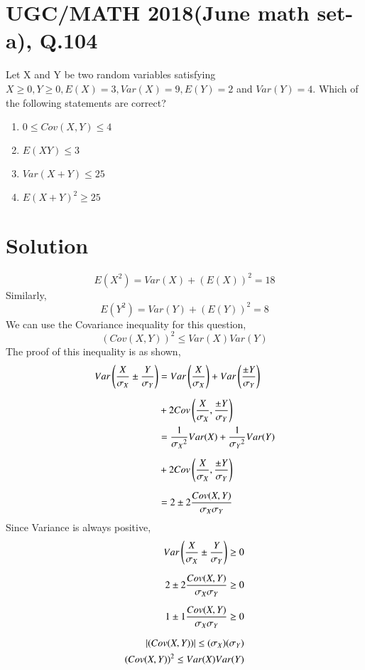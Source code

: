 \documentclass[journal,12pt,twocolumn]{IEEEtran}
\begin{document}
\section*{UGC/MATH 2018(June math set-a), Q.104}
Let X and Y be two random variables satisfying $X\geq 0, Y \geq 0, E(X)=3, Var(X)=9, E(Y)=2$ and $Var(Y)=4$. Which of the following statements are correct?
\begin{enumerate}[label=\Alph*)]
    \item $0\leq Cov(X,Y)\leq 4$
    \item $E(XY)\leq 3$
    \item $Var(X+Y)\leq 25$
    \item $E(X+Y)^2\geq 25$
\end{enumerate}
\section*{Solution}
\begin{equation}
    E(X^2) = Var(X)+(E(X))^2 = 18
\end{equation}
Similarly,
\begin{equation}
    E(Y^2) = Var(Y)+(E(Y))^2 = 8
\end{equation}
We can use the Covariance inequality for this question,
\begin{equation}
  ({Cov(X,Y)})^2\leq Var(X)Var(Y)
\end{equation}
The proof of this inequality is as shown,
\begin{align}
\nonumber    Var\left(\dfrac{X}{\sigma_X}\pm\dfrac{Y}{\sigma_Y}\right) &= Var\left(\dfrac{X}{\sigma_X}\right)+Var\left(\dfrac{\pm Y}{\sigma_Y}\right)\\[6pt]
    &+2Cov\left(\dfrac{X}{\sigma_X},\dfrac{\pm Y}{\sigma_Y}\right)\\
\nonumber    &=\dfrac{1}{{\sigma_X}^2}Var(X)+\dfrac{1}{{\sigma_Y}^2}Var(Y)\\[6pt]
    &+2 Cov\left(\dfrac{X}{\sigma_X},\dfrac{\pm Y}{\sigma_Y}\right)\\[6pt]
    &=2\pm2\dfrac{Cov(X,Y)}{{\sigma_X}{\sigma_Y}}
\end{align}
Since Variance is always positive,
\begin{align}
    Var\left(\dfrac{X}{\sigma_X}\pm\dfrac{Y}{\sigma_Y}\right)\geq 0
    \\[6pt]
    2\pm2\dfrac{Cov(X,Y)}{{\sigma_X}{\sigma_Y}} \geq 0
    \\[6pt]
    1\pm1\dfrac{Cov(X,Y)}{{\sigma_X}{\sigma_Y}}\geq 0
    \\[6pt]
    \vert({Cov(X,Y)})\vert\leq (\sigma_X)(\sigma_Y)
    \\
    ({Cov(X,Y)})^2\leq Var(X)Var(Y)
\end{align}
\end{document}
